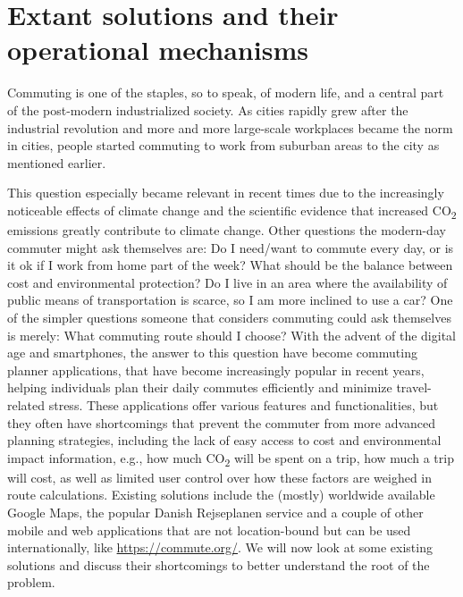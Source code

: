 \section{Extant solutions and their operational mechanisms}\label{sec:extant-solutions-and-their-operational-mechanisms}

Commuting is one of the staples, so to speak, of modern life, and a central part of the post-modern industrialized
society.
As cities rapidly grew after the industrial revolution and more and more large-scale workplaces became the norm in
cities, people started commuting to work from suburban areas to the city as mentioned earlier.

This question especially became relevant in recent times due to the increasingly noticeable effects of climate change
and the scientific evidence that increased \unit{CO_{2}} emissions greatly contribute to climate change.
Other questions the modern-day commuter might ask themselves are: Do I need/want to commute every day, or is it ok if I
work from home part of the week?
What should be the balance between cost and environmental protection?
Do I live in an area where the availability of public means of transportation is scarce, so I am more inclined to use a
car?
One of the simpler questions someone that considers commuting could ask themselves is merely: What commuting route
should I choose?
With the advent of the digital age and smartphones, the answer to this question have become commuting planner
applications, that have become increasingly popular in recent years, helping individuals plan their daily commutes
efficiently and minimize travel-related stress.
These applications offer various features and functionalities, but they often have shortcomings that prevent the
commuter from more advanced planning strategies, including the lack of easy access to cost and environmental impact
information, e.g., how much \unit{CO_{2}} will be spent on a trip, how much a trip will cost, as well as limited user
control over how these factors are weighed in route calculations.
Existing solutions include the (mostly) worldwide available Google Maps, the popular Danish Rejseplanen service and a
couple of other mobile and web applications that are not location-bound but can be used internationally, like
\url{https://commute.org/}.
We will now look at some existing solutions and discuss their shortcomings to better understand the root of the problem.




